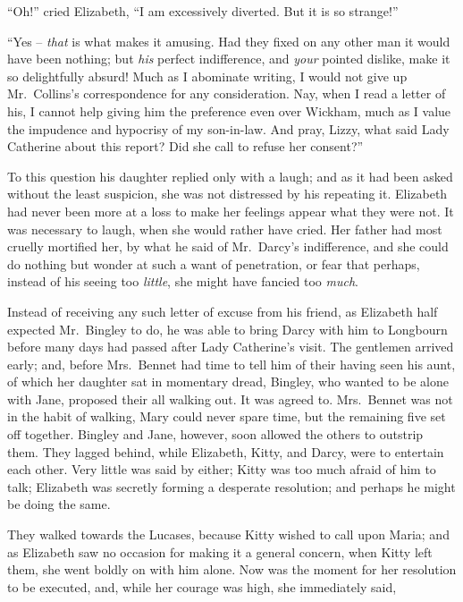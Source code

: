 “Oh!” cried Elizabeth, “I am excessively diverted.
But it is so strange!”

“Yes -- \textit{that} is what makes it amusing. Had they fixed
on any other man it would have been nothing; but \textit{his}
perfect indifference, and \textit{your} pointed dislike, make it so
delightfully absurd! Much as I abominate writing, I would
not give up Mr.\ Collins’s correspondence for any consideration.
Nay, when I read a letter of his, I cannot
help giving him the preference even over Wickham, much
as I value the impudence and hypocrisy of my son-in-law.
And pray, Lizzy, what said Lady Catherine about this
report? Did she call to refuse her consent?”

To this question his daughter replied only with a laugh;
and as it had been asked without the least suspicion, she
was not distressed by his repeating it. Elizabeth had
never been more at a loss to make her feelings appear
what they were not. It was necessary to laugh, when
she would rather have cried. Her father had most cruelly
mortified her, by what he said of Mr.\ Darcy’s indifference,
and she could do nothing but wonder at such a want of
penetration, or fear that perhaps, instead of his seeing
too \textit{little}, she might have fancied too \textit{much}.


Instead of receiving any such letter of excuse from his
friend, as Elizabeth half expected Mr.\ Bingley to do, he
was able to bring Darcy with him to Longbourn before
many days had passed after Lady Catherine’s visit. The
gentlemen arrived early; and, before Mrs.\ Bennet had
time to tell him of their having seen his aunt, of which
her daughter sat in momentary dread, Bingley, who
wanted to be alone with Jane, proposed their all walking
out. It was agreed to. Mrs.\ Bennet was not in the habit
of walking, Mary could never spare time, but the remaining
five set off together. Bingley and Jane, however, soon
allowed the others to outstrip them. They lagged behind,
while Elizabeth, Kitty, and Darcy, were to entertain each
other. Very little was said by either; Kitty was too
much afraid of him to talk; Elizabeth was secretly
forming a desperate resolution; and perhaps he might be
doing the same.

They walked towards the Lucases, because Kitty wished
to call upon Maria; and as Elizabeth saw no occasion
for making it a general concern, when Kitty left them, she
went boldly on with him alone. Now was the moment
for her resolution to be executed, and, while her courage
was high, she immediately said,

